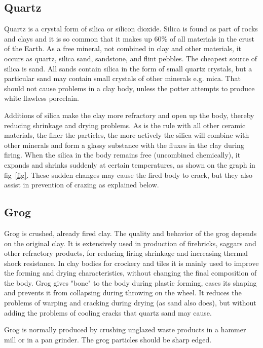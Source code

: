 \subsection{Quartz}
Quartz is a crystal form of silica or silicon dioxide. Silica is found as part 
of rocks and clays and it is so common that it makes up 60\% of all materials 
in the crust of the Earth. As a free mineral, not combined in clay and other 
materials, it occurs as quartz, silica sand, sandstone, and flint pebbles. The 
cheapest source of silica is sand. All sands contain silica in the form of 
small quartz crystals, but a particular sand may contain small crystals of 
other minerals e.g. mica. That should not cause problems in a clay body, unless 
the potter attempts to produce white flawless porcelain.

Additions of silica make the clay more refractory and open up the body, thereby 
reducing shrinkage and drying problems. As is the rule with all other ceramic 
materials, the finer the particles, the more actively the silica will combine 
with other minerals and form a glassy substance with the fluxes in the clay 
during firing. When the silica in the body remains free (uncombined 
chemically), it expands and shrinks suddenly at certain temperatures, as shown 
on the graph in fig~\ref{fig}. These sudden changes may cause the fired body to 
crack, but they also assist in prevention of crazing as explained below.
\subsection{Grog}
Grog is crushed, already fired clay. The quality and behavior of the grog 
depends on the original clay. It is extensively used in production of 
firebricks, saggars and other refractory products, for reducing firing 
shrinkage and increasing thermal shock resistance. In clay bodies for crockery 
and tiles it is mainly used to improve the forming and drying characteristics, 
without changing the final composition of the body. Grog gives "bone" to the 
body during plastic forming, eases its shaping and prevents it from collapsing 
during throwing on the wheel. It reduces the problems of warping and cracking 
during drying (as sand also does), but without adding the problems of cooling 
cracks that quartz sand may cause.

Grog is normally produced by crushing unglazed waste products in a hammer mill 
or in a pan grinder. The grog particles should be sharp edged.
